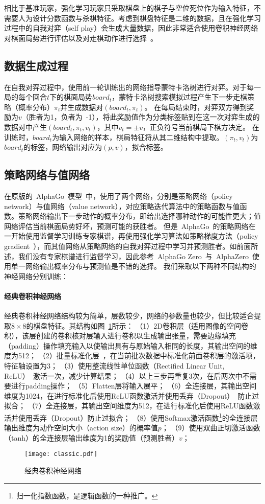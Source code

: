 相比于基准玩家，强化学习玩家只采取棋盘上的棋子与空位死位作为输入特征，不需要人为设计分数函数与杀棋特征。考虑到棋盘特征是二维的数据，且在强化学习过程中的自我对弈（self play）会生成大量数据，因此非常适合使用卷积神经网络对棋面局势进行评估以及对走棋动作进行选择~\cite{Silver2016}。

\subsection{数据生成过程}
在自我对弈过程中，使用前一轮训练出的网络指导蒙特卡洛树进行对弈。对于每一局的每个回合$t$下的棋面局势$board_{t}$，蒙特卡洛树搜索模拟过程产生下一步走棋策略（概率分布）$\pi_{t}$并生成数据对$(board_{t},\pi_{t})$。
在每局结束时，对弈双方得到奖励为$v$（胜者为1，负者为~-1），将此奖励值作为分类标签贴到在这一次对弈生成的数据对中产生$(board_{t},\pi_{t},v_{t})$，其中$v_{t}=\pm v$，正负符号当前棋局下棋方决定。
在训练时，$board_{t}$为输入网络的样本，棋局特征将从其二维结构中提取。$(\pi_{t},v_{t})$为$board_{t}$的标签，网络输出对应为$(p,v)$，拟合标签。
\subsection{策略网络与值网络}
在原版的~AlphaGo~模型~\cite{Silver2016}中，使用了两个网络，分别是策略网络（policy network）与值网络（value network），对应策略迭代算法中的策略函数与值函数。策略网络输出下一步动作的概率分布，即给出选择哪种动作的可能性更大；值网络评估当前棋面局势好坏，预测可能的获胜者。
但是~AlphaGo~的策略网络在一开始使用监督学习训练专家棋谱，再使用强化学习算法如策略梯度方法（policy gradient~\cite{silver2014deterministic}），而其值网络从策略网络的自我对弈过程中学习并预测胜者。如前面所述，我们没有专家棋谱进行监督学习，因此参考~AlphaGo Zero~与~AlphaZero~使用单一网络输出概率分布与预测值是不错的选择。
我们采取以下两种不同结构的神经网络分别训练：
\paragraph{经典卷积神经网络}
经典卷积神经网络结构较为简单，层数较少，网络的参数量也较少，但比较适合提取$8\times8$的棋盘特征。其结构如图~\ref{fig:cnn}所示：
（1）2D卷积层（适用图像的空间卷积），该层创建的卷积核对层输入进行卷积以生成输出张量，需要边缘填充（padding）操作填充输入以使输出具有与原始输入相同的长度，其输出空间的维度为512；
（2）批量标准化层~\cite{batchnorm}，在当前批次数据中标准化前面卷积层的激活项，特征轴设置为3；
（3）使用整流线性单位函数（Rectified Linear Unit, ReLU）~\cite{xu2015empirical}激活一次，减少计算结果；
（4）以上三步再重复3次，在后两次中不需要进行padding操作；
（5）Flatten层将输入展平；
（6）全连接层，其输出空间维度为1024，在进行标准化后使用ReLU函数激活并使用丢弃（Dropout）~\cite{srivastava2014dropout}防止过拟合；
（7）全连接层，其输出空间维度为512，在进行标准化后使用ReLU函数激活并使用丢弃（Dropout）防止过拟合；
（8）使用Softmax激活函数\footnote{归一化指数函数，是逻辑函数的一种推广。}的全连接层输出维度为动作空间大小（action size）的概率值$p$；
（9）使用双曲正切激活函数（tanh）的全连接层输出维度为1的奖励值（预测胜者）$v$；
\begin{figure}[htb]
    \centering
    \texttt{[image: classic.pdf]}
    \caption[cnn]{%
    经典卷积神经网络%
      }
    \label{fig:cnn}
\end{figure}
